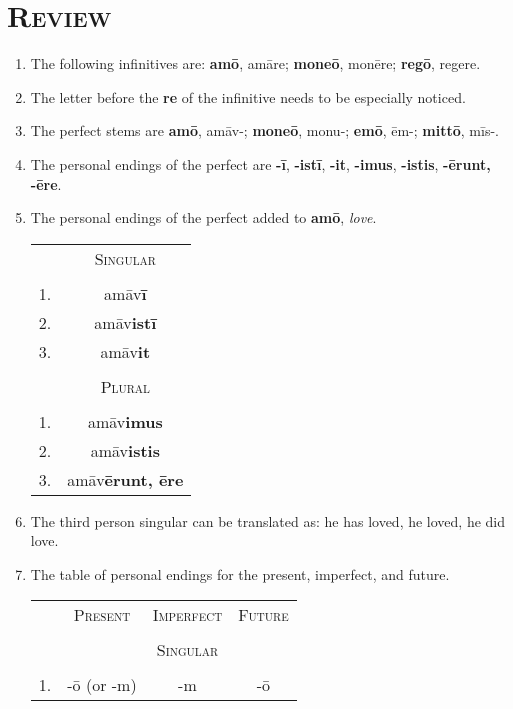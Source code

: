 \documentclass[12pt]{article}
\begin{document}
\section{\textsc{Review}}
\begin{enumerate}[1.]
	\item The following infinitives are: \textbf{amō}, amāre; \textbf{moneō}, monēre; \textbf{regō}, regere.
	\item The letter before the \textbf{re} of the infinitive needs to be especially noticed.
	\item The perfect stems are \textbf{amō}, amāv-; \textbf{moneō}, monu-; \textbf{emō}, ēm-; \textbf{mittō}, mīs-.
	\item The personal endings of the perfect are \textbf{-ī}, \textbf{-istī}, \textbf{-it}, \textbf{-imus}, \textbf{-istis}, \textbf{-ērunt, -ēre}.
	\item The personal endings of the perfect added to \textbf{amō}, \textit{love}.
	\begin{center}
		\begin{tabular}{ c c }
		& \textsc{Singular} \\
		& \\
		\textsc{1}. & amāv\textbf{ī} \\
		\textsc{2}. & amāv\textbf{istī} \\
		\textsc{3}. & amāv\textbf{it} \\
		& \\
		& \textsc{Plural} \\
		& \\
		\textsc{1}. & amāv\textbf{imus} \\
		\textsc{2}. & amāv\textbf{istis} \\
		\textsc{3}. & amāv\textbf{ērunt, ēre}
		\end{tabular}
	\end{center}
	\item The third person singular can be translated as: he has loved, he loved, he did love.
	\item The table of personal endings for the present, imperfect, and future.
	\begin{center}
		\begin{tabular}{ c c c c }
		& \textsc{Present} & \textsc{Imperfect} & \textsc{Future} \\
		& & & \\
		& & \textsc{Singular} & \\
		& & & \\
		\textsc{1}. & -ō (or -m) & -m & -ō \\

\end{tabular}
\end{center}
\end{enumerate}
\end{document}
